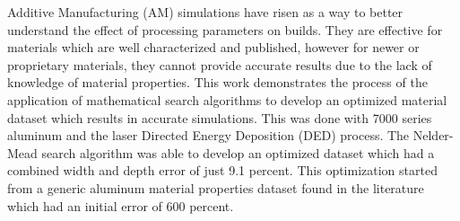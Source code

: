 Additive Manufacturing (AM) simulations have risen as a way to better understand the effect of processing parameters on builds.  They are effective for materials which are well characterized and published, however for newer or proprietary materials, they cannot provide accurate results due to the lack of knowledge of material properties.  This work demonstrates the process of the application of mathematical search algorithms to develop an optimized material dataset which results in accurate simulations.  This was done with 7000 series aluminum and the laser Directed Energy Deposition (DED) process.  The Nelder-Mead search algorithm was able to develop an optimized dataset which had a combined width and depth error of just 9.1 percent.  This optimization started from a generic aluminum material properties dataset found in the literature which had an initial error of 600 percent.
